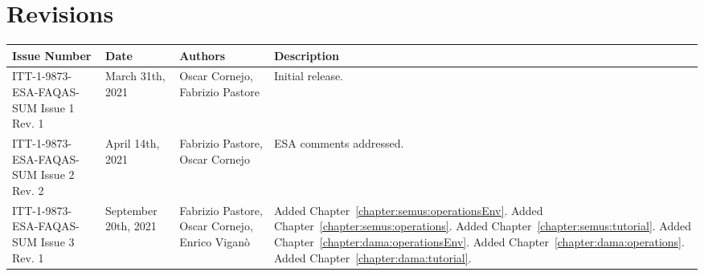 
\section*{Revisions}
\label{sec:revisions}

\setlength\LTleft{0pt}
\setlength\LTright{0pt}
\scriptsize 
\begin{longtable}{|p{2cm}|p{2cm}|p{2cm}|p{7cm}|@{}}
\label{table:codeoperators} \\
\hline
\textbf{Issue Number}&\textbf{Date}&\textbf{Authors}&\textbf{Description}\\
\hline
ITT-1-9873-ESA-FAQAS-SUM
Issue 1 Rev. 1&
March 31th, 2021&
Oscar Cornejo, Fabrizio Pastore&
\begin{minipage}{8cm}
Initial release.
\end{minipage}
\\
\hline
ITT-1-9873-ESA-FAQAS-SUM
Issue 2 Rev. 2&
April 14th, 2021&
Fabrizio Pastore, Oscar Cornejo&
\begin{minipage}{8cm}
ESA comments addressed.
\end{minipage}
\\
\hline
ITT-1-9873-ESA-FAQAS-SUM
Issue 3 Rev. 1&
September 20th, 2021&
Fabrizio Pastore, Oscar Cornejo, Enrico Viganò&
\begin{minipage}{8cm}
Added Chapter~\ref{chapter:semus:operationsEnv}.
Added Chapter~\ref{chapter:semus:operations}.
Added Chapter~\ref{chapter:semus:tutorial}.
Added Chapter~\ref{chapter:dama:operationsEnv}.
Added Chapter~\ref{chapter:dama:operations}.
Added Chapter~\ref{chapter:dama:tutorial}.
\end{minipage}
\\
\hline



                                                    
\end{longtable}
\normalsize

\clearpage